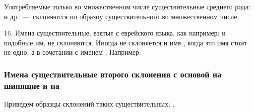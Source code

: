 \documentclass[11pt,a4paper,oneside]{memoir}
\begin{document}
    Употребляемые только во множественном числе существительные среднего рода: {} и др.~---~склоняются по образцу существительного {} во множественном числе.
    
    16. Имена существительные, взятые с еврейского языка, как например: {} и подобные им, не склоняются. Иногда не склоняется и имя {}, когда это имя стоит не одно, а в сочетании с именем {}. Например:
    
    \bigskip{}

    
                \subsubsection{Имена существительные второго склонения с основой на шипящие и на {}}

    Приведем образцы склонений таких существительных: {}.
    
\end{document}
